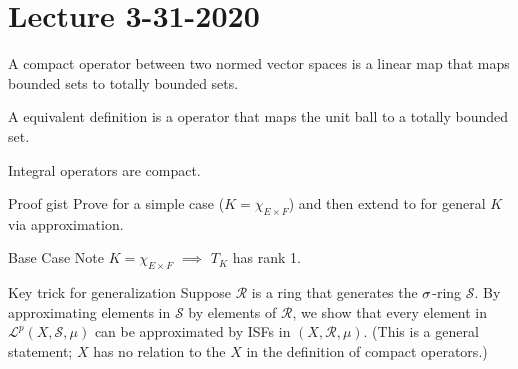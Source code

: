\section{Lecture 3-31-2020}
\begin{dfn}
    A compact operator between two normed vector spaces is a linear map that maps bounded sets to totally bounded sets.
\end{dfn}
\begin{remark}
    A equivalent definition is a operator that maps the unit ball to a totally bounded set.
\end{remark}
\begin{thm}
    Integral operators are compact.
\end{thm}
\begin{details}{Proof gist}
    Prove for a simple case ($K = \chi_{E \times F}$) and then extend to for general $K$ via approximation.
\end{details}
\begin{details}{Base Case}
    Note $K = \chi_{E \times F}$ $\implies$ $T_K$ has rank 1. 
\end{details}
\begin{details}{Key trick for generalization}
    Suppose $\mathcal R$ is a ring that generates the $\sigma$-ring $\mathcal S$. By approximating elements in $\mathcal S$ by elements of $\mathcal R$, we show that every element in $\mathcal L^p(X, \mathcal S, \mu)$ can be approximated by ISFs in $(X , \mathcal R, \mu)$. (This is a general statement; $X$ has no relation to the $X$ in the definition of compact operators.)
\end{details}
